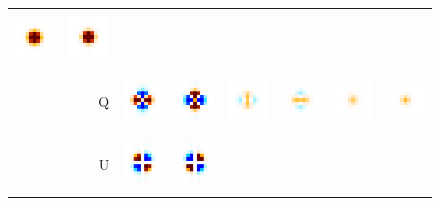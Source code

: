 \documentclass{article}
\begin{document}
\begin{figure}
\begin{tabular}{m{35mm}rm{11mm}m{11mm}m{11mm}m{11mm}m{11mm}m{11mm}}
		\includegraphics[height=14mm]{plots/ellip_mismatch_srcs_sb_tot_crop_0.png} &
		\includegraphics[height=14mm]{plots/circular_srcs_sb_tot_crop_0.png} \\
		&
		Q &
		\includegraphics[height=14mm]{plots/ellip_mismatch_srcs_sb_det0_crop_1.png} &
		\includegraphics[height=14mm]{plots/ellip_mismatch_srcs_sb_det1_crop_1.png} &
		\includegraphics[height=14mm]{plots/ellip_mismatch_srcs_sb_det01_crop_1.png} &
		\includegraphics[height=14mm]{plots/ellip_mismatch_srcs_sb_det23_crop_1.png} &
		\includegraphics[height=14mm]{plots/ellip_mismatch_srcs_sb_tot_crop_1.png} &
		\includegraphics[height=14mm]{plots/circular_srcs_sb_tot_crop_1.png} \\
		&
		U &
		\includegraphics[height=14mm]{plots/ellip_mismatch_srcs_sb_det0_crop_2.png} &
		\includegraphics[height=14mm]{plots/ellip_mismatch_srcs_sb_det1_crop_2.png} &

\end{tabular}
\end{figure}
\end{document}
